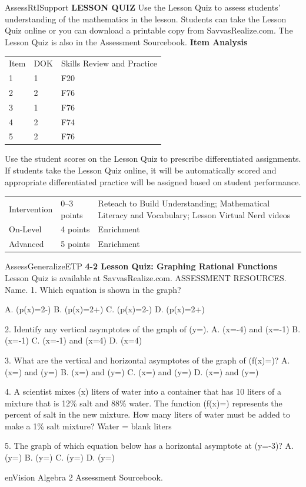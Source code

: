 \documentclass{article}
\newenvironment{te-addendum}[2]{}{}     %
\newcommand{\answer}[1]{}               %
\newcommand{\placeholder}[2]{}          %
\newcommand{\te}[1]{}                   %
\begin{document}
\begin{te-addendum}{Assess}{RtISupport}
\textbf{LESSON QUIZ}
Use the Lesson Quiz to assess students' understanding of the mathematics in the lesson.
Students can take the Lesson Quiz online or you can download a printable copy from SavvasRealize.com. The Lesson Quiz is also in the Assessment Sourcebook.
\textbf{Item Analysis}
\begin{tabular}{lll}
Item & DOK & Skills Review and Practice \\
1 & 1 & F20 \\
2 & 2 & F76 \\
3 & 1 & F76 \\
4 & 2 & F74 \\
5 & 2 & F76 \\
\end{tabular}
Use the student scores on the Lesson Quiz to prescribe differentiated assignments.
If students take the Lesson Quiz online, it will be automatically scored and appropriate differentiated practice will be assigned based on student performance.
\begin{tabular}{lll}
Intervention & 0--3 points & Reteach to Build Understanding; Mathematical Literacy and Vocabulary; Lesson Virtual Nerd videos \\
On-Level & 4 points & Enrichment \\
Advanced & 5 points & Enrichment \\
\end{tabular}
\end{te-addendum}
\begin{te-addendum}{Assess}{GeneralizeETP}
\textbf{4-2 Lesson Quiz: Graphing Rational Functions}
Lesson Quiz is available at SavvasRealize.com. ASSESSMENT RESOURCES. Name.
1. Which equation is shown in the graph?
\placeholder{graph}{Quiz1 black reciprocal-type two-branch curve, axes x,y,O, window -5 to5 both, unit grid, labels -4,-2,2,4. Vertical asymptote x=-2 implicit, horizontal y2 implicit, four end arrows; left branch above2,right below2, no marked points.}
A. (p(x)=2-)
B. (p(x)=2+)
C. (p(x)=2-)
D. (p(x)=2+)
\answer{1. C}
2. Identify any vertical asymptotes of the graph of (y=).
A. (x=-4) and (x=-1)
B. (x=-1)
C. (x=-1) and (x=4)
D. (x=4)
\answer{2. D}
3. What are the vertical and horizontal asymptotes of the graph of (f(x)=)?
A. (x=) and (y=)
B. (x=) and (y=)
C. (x=) and (y=)
D. (x=) and (y=)
\answer{3. A}
4. A scientist mixes (x) liters of water into a container that has 10 liters of a mixture that is 12\% salt and 88\% water. The function (f(x)=) represents the percent of salt in the new mixture. How many liters of water must be added to make a 1\% salt mixture?
Water = blank liters
\answer{4. 110 liters}
\te{Printed function gives a fraction of the mixture; the wording calls it percent.}
5. The graph of which equation below has a horizontal asymptote at (y=-3)?
A. (y=)
B. (y=)
C. (y=)
D. (y=)
\answer{5. C}
enVision Algebra 2 Assessment Sourcebook.
\end{te-addendum}
\end{document}
